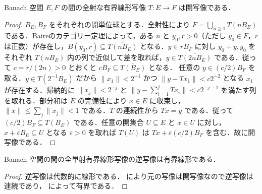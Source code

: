 \begin{prop}[開写像定理]
Banach 空間 $E,F$ の間の全射な有界線形写像 $T:E\to F$ は開写像である．
\end{prop}
\begin{proof}
$B_E,B_F$ をそれぞれの開単位球とする．全射性により $F=\bigcup_{n\geq1}T(nB_E)$ である．Baireのカテゴリー定理によって，ある $n$ と $y_0,r>0$（ただし $y_0\in F$，$r$ は正数）が存在し，$B(y_0,r)\subseteq\overline{T(nB_E)}$ となる．$y\in rB_F$ に対し $y_0+y,y_0$ をそれぞれ $T(nB_E)$ 内の列で近似して差を取れば，$y\in\overline{T(2nB_E)}$ である．従って $c=r/(2n)>0$ とおくと $cB_F\subseteq\overline{T(B_E)}$ となる．
任意の $y\in(c/2)B_F$ を取る．$y\in\overline{T(2^{-1}B_E)}$ だから $\|x_1\|<2^{-1}$ かつ $\|y-Tx_1\|<c2^{-2}$ となる $x_1$ が存在する．帰納的に $\|x_j\|<2^{-j}$ と $\|y-\sum_{i=1}^j Tx_i\|<c2^{-j-1}$ を満たす列を取れる．部分和は $E$ の完備性により $x\in E$ に収束し，$\|x\|\leq\sum_j\|x_j\|<1$ である．$T$ の連続性から $Tx=y$ である．従って $(c/2)B_F\subseteq T(B_E)$ である．任意の開集合 $U\subseteq E$ と $x\in U$ に対し，$x+\varepsilon B_E\subseteq U$ となる $\varepsilon>0$ を取れば $T(U)$ は $Tx+\varepsilon(c/2)B_F$ を含む．故に開写像である．
\end{proof}
\begin{prop}[有界逆写像定理]
Banach 空間の間の全単射有界線形写像の逆写像は有界線形である．
\end{prop}
\begin{proof}
逆写像は代数的に線形である． により元の写像は開写像なので逆写像は連続であり， によって有界である．
\end{proof}
